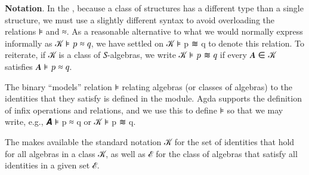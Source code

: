 \documentclass[a4paper,UKenglish,cleveref,autoref,thm-restate]{lipics-v2021}
\begin{document}
\noindent \textbf{Notation}. In the \agdaualib, because a class of structures has a different type than a single structure, we must use a slightly different syntax to avoid overloading the relations \af ⊧ and \af ≈. As a reasonable alternative to what we would normally express informally as 𝒦 \aof ⊧ \ab 𝑝 \aof ≈ \ab 𝑞, we have settled on \ab 𝒦 \aof ⊧ \ab p \aof ≋ \ab q to denote this relation.  To reiterate, if \ab 𝒦 is a class of \ab 𝑆-algebras, we write \ab 𝒦 \aof ⊧ \ab 𝑝 \aof ≋ \ab 𝑞 if every \ab 𝑨 \aof ∈ \ab 𝒦 satisfies \ab 𝑨 \aof ⊧ \ab 𝑝 \aof ≈ \ab 𝑞.

The binary ``models'' relation \aof ⊧ relating algebras (or classes of algebras) to the identities that they satisfy is defined in the \ualibModelTheory module.  Agda supports the definition of infix operations and relations, and we use this to define \aof ⊧ so that we may write, e.g., \ab 𝑨 \aof ⊧ \ab p \aof ≈ \ab q or \ab 𝒦 \aof ⊧ \ab p \aof ≋ \ab q.
\ccpad
\begin{code}%

\end{code}
\ccpad

The \agdaualib makes available the standard notation  \ab 𝒦 for the set of identities that hold for all algebras in a class \ab 𝒦, as well as  \ab ℰ for the class of algebras that satisfy all identities in a given set \ab ℰ.
\ccpad
\begin{code}%
  
\end{code}
\end{document}
